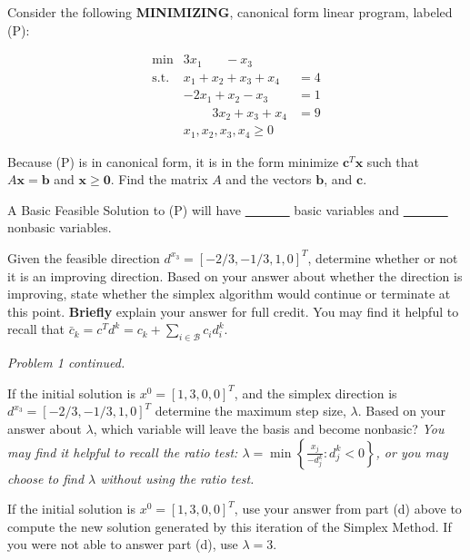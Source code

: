 
Consider the following {\bf MINIMIZING}, canonical form linear program, labeled (P):
\vspace{-2mm}

\begin{equation}
  \label{eq:1}
  \tag{P}
  \begin{array}{lll}
    \min & 3 x_1 \phantom{+  x_2} -  x_3 \phantom{+ 5 x_4} \\
    \mbox{s.t.} & x_1 + x_2 + x_3  + x_4 & = 4 \\[1mm]
    & -2 x_1 + x_2 - x_3  & = 1 \\
    & \phantom{-5 x_1} 3 x_2 + x_3 + x_4 &  = 9 \\
    & x_1, x_2, x_3, x_4 \geq 0 &
  \end{array}
\end{equation}



\begin{parts}
 Because (P) is in canonical form, it is in the form minimize $\mathbf{c}^T \mathbf{x} $ such that $A\mathbf{x} = \mathbf{b}$ and $\mathbf{x} \geq \mathbf{0}$.  Find the matrix $A$ and the vectors $\mathbf{b}$, and $\mathbf{c}$. 


\vspace{6cm}

 A Basic Feasible Solution to (P) will have \underline{ \ \ \ \ \ \ \ } basic variables and \underline{ \ \ \ \ \ \ \ } nonbasic variables.


\vspace{1.5cm}


 Given the feasible direction $d^{x_3} = [-2/3, -1/3, 1, 0]^T$, determine whether or not it is an improving direction.  Based on your answer about whether the direction is improving, state whether the simplex algorithm would continue or terminate at this point.  {\bf Briefly} explain your answer for full credit.  You may find it helpful to recall that $\bar c_k = c^T d^k = c_k + \sum_{i \in \mathcal{B}} c_i d_i^k$.

\vfill
\newpage
\noindent \emph{Problem 1 continued.}


 If the initial solution is $x^0 = [1,3,0,0]^T$, and the simplex direction is $d^{x_3} = [-2/3, -1/3, 1, 0]^T$ determine the maximum step size, $\lambda$.  Based on your answer about $\lambda$, which variable will leave the basis and become nonbasic? \emph{You may find it helpful to recall the ratio test: $\lambda = \min \left\{ \frac{x_j}{-d_j^k}:d_j^k < 0 \right\}$, or you may choose to find $\lambda$ without using the ratio test.} 



\vfill

 If the initial solution is $x^0 = [1,3,0,0]^T$, use your answer from part (d) above to compute the new solution generated by this iteration of the Simplex Method.  If you were not able to answer part (d), use $\lambda = 3$.

\vfill

\end{parts}

